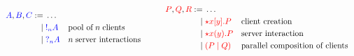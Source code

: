 \documentclass[12pt,UKenglish]{article}
\begin{document}
\clearpage

\begin{landscape}
\begin{center}
  \cpInfAx
  \cpInfCut
\end{center}
\begin{center}
  \cpInfTens
  \cpInfParr
\end{center}
\begin{center}
  \cpInfOne
  \cpInfBot 
\end{center}
\begin{center}
\end{center}
\begin{center}
  \cpInfWith
  \cpInfTop 
\end{center}
\end{landscape}

\clearpage

\[\!
  \begin{aligned}
    \ty{A}, \ty{B}, \ty{C}
         :=& \; \dots
    \\ \mid& \; \ty{\take[n]{A}} &&\text{pool of} \; n \; \text{clients}
    \\ \mid& \; \ty{\give[n]{A}} &&n \; \text{server interactions}
  \end{aligned}
  \qquad
  \begin{aligned}
    \tm{P}, \tm{Q}, \tm{R}
         :=& \; \dots
    \\ \mid& \; \tm{\ncCnt{x}{y}{P}} &&\text{client creation}
    \\ \mid& \; \tm{\ncSrv{x}{y}{P}} &&\text{server interaction}
    \\ \mid& \; \tm{\ncPool{P}{Q}}   &&\text{parallel composition of clients}
  \end{aligned}
\]

\vspace*{1\baselineskip}

\begin{center}
\end{center}
\begin{center}
  \ncInfPool
  \ncInfCont
\end{center}

\clearpage
\end{document}
